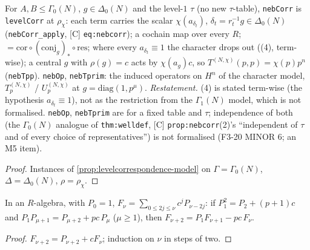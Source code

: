\begin{proposition}\label{prop:nebcorr-model}
  \leanok
  For $A,B\le\Gamma_0(N)$, $g\in\Delta_0(N)$ and the level-$1$ $\tau$ (no new $\tau$-table), \texttt{nebCorr} is \texttt{levelCorr} at
  $\rho_\chi$: each term carries the scalar $\chi(a_{\delta_t})$, $\delta_t=r_t^{-1}g\in\Delta_0(N)$ (\texttt{nebCorr\_apply},
  [C] \texttt{eq:nebcorr}); a cochain map over every $R$; $=\mathrm{cor}\circ(\mathrm{conj}_g)_*\circ\mathrm{res}$; where every
  $a_{\delta_t}\equiv1$ the character drops out ((4), term-wise); a central $g$ with $\rho(g)=c$ acts by $\chi(a_g)c$, so
  $T^{(N,\chi)}(p,p)=\chi(p)p^n$ (\texttt{nebTpp}). \texttt{nebOp}, \texttt{nebTprim}: the induced operators on $H^n$ of the
  character model, $T^{(N,\chi)}_{p}$ / $U^{(N,\chi)}_p$ at $g=\mathrm{diag}(1,p^\mu)$.
  \emph{Restatement.} (4) is stated term-wise (the hypothesis $a_{\delta_t}\equiv1$), not as the restriction from the $\Gamma_1(N)$
  model, which is not formalised. \texttt{nebOp}, \texttt{nebTprim} are for a fixed table and $\tau$; independence of both (the
  $\Gamma_0(N)$ analogue of \texttt{thm:welldef}, [C] \texttt{prop:nebcorr}(2)'s ``independent of $\tau$ and of every choice of
  representatives'') is not formalised (F3-20 MINOR 6; an M5 item).
\end{proposition}
\begin{proof}
  \leanok
  Instances of \ref{prop:levelcorrespondence-model} on $\Gamma=\Gamma_0(N)$, $\Delta=\Delta_0(N)$, $\rho=\rho_\chi$.
\end{proof}

\begin{lemma}\label{lem:m4-fullrec}
  \leanok
  In an $R$-algebra, with $P_0=1$, $F_\nu=\sum_{0\le2j\le\nu}c^jP_{\nu-2j}$: if $P_1^2=P_2+(p+1)c$ and
  $P_1P_{\mu+1}=P_{\mu+2}+pc\,P_\mu$ ($\mu\ge1$), then $F_{\nu+2}=P_1F_{\nu+1}-pc\,F_\nu$.
\end{lemma}
\begin{proof}
  \leanok
  $F_{\nu+2}=P_{\nu+2}+cF_\nu$; induction on $\nu$ in steps of two.
\end{proof}

